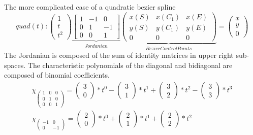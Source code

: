\documentclass[a4paper,portrait]{report}
\begin{document}
The more complicated case of a quadratic bezier spline
\begin{equation}
quad(t):
\begin{pmatrix}
1 \\
t \\
t^2
\end{pmatrix}
\underbrace{\begin{bmatrix}
1 & -1 & 0\\
0 & 1 & -1\\
0 & 0 &1
\end{bmatrix}}_{Jordanian}
\underbrace{\begin{pmatrix}
x(S) & x(C_{1}) & x(E) \\
y(S) & y(C_{1}) & y(E) \\
0 & 0 & 0
\end{pmatrix}}_{Bezier Control Points}
=
\begin{pmatrix}
x \\
y \\
0
\end{pmatrix}
\end{equation}
The Jordanian is composed of the sum of identity matrices in upper right sub-spaces.
The characteristic polynomials of the diagonal and bidiagonal are composed of binomial coefficients.
\begin{align}
\chi_{\begin{pmatrix}1 & 0 & 0\\0 & 1 & 0\\0 & 0 & 1\end{pmatrix}} = \begin{pmatrix}3 \\ 0\end{pmatrix}*t^0 - \begin{pmatrix}3 \\ 1\end{pmatrix}*t^1 + \begin{pmatrix}3 \\ 2\end{pmatrix}*t^2 - \begin{pmatrix}3 \\ 3\end{pmatrix}*t^3\\
\chi_{\begin{pmatrix}-1 & 0\\0 & -1\end{pmatrix}} = \begin{pmatrix}2 \\ 0\end{pmatrix}*t^0 + \begin{pmatrix}2 \\ 1\end{pmatrix}*t^1 + \begin{pmatrix}2 \\ 2\end{pmatrix}*t^2
\end{align}
\end{document}
